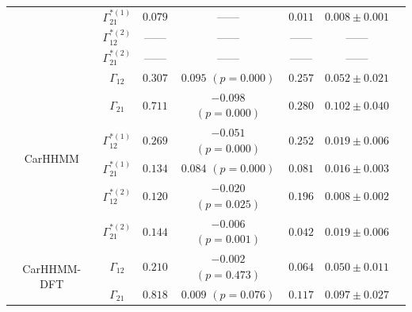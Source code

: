 \documentclass{article}
\begin{document}
\begin{center}
{\begin{tabular}{ccccccc}
                             & $\Gamma^{*(1)}_{21}$          & $0.079$                         & ------                   & $0.011$                           & $0.008 \pm 0.001$                             \\
                             & $\Gamma^{*(2)}_{12}$          & ------                         & ------                   & ------                           & ------                                      \\
                             & $\Gamma^{*(2)}_{21}$          & ------                         & ------                   & ------                           & ------                                      \\ \hline
\multirow{6}{*}{CarHHMM}     & $\Gamma_{12}$                 & $0.307$                         & $0.095$ $(p=0.000)$        & $0.257$                           & $0.052 \pm 0.021$                             \\
                             & $\Gamma_{21}$                 & $0.711$                         & $-0.098$ $(p=0.000)$        & $0.280$                           & $0.102 \pm 0.040$                             \\
                             & $\Gamma^{*(1)}_{12}$          & $0.269$                         & $-0.051$ $(p=0.000)$        & $0.252$                           & $0.019 \pm 0.006$                             \\
                             & $\Gamma^{*(1)}_{21}$          & $0.134$                         & $0.084$ $(p=0.000)$        & $0.081$                           & $0.016 \pm 0.003$                             \\
                             & $\Gamma^{*(2)}_{12}$          & $0.120$                         & $-0.020$ $(p=0.025)$        & $0.196$                           & $0.008 \pm 0.002$                             \\
                             & $\Gamma^{*(2)}_{21}$          & $0.144$                         & $-0.006$ $(p=0.001)$        & $0.042$                           & $0.019 \pm 0.006$                             \\ \hline
\multirow{6}{*}{CarHHMM-DFT} & $\Gamma_{12}$                 & $0.210$                         & $-0.002$ $(p=0.473)$        & $0.064$                           & $0.050 \pm 0.011$                             \\
                             & $\Gamma_{21}$                 & $0.818$                         & $0.009$ $(p=0.076)$        & $0.117$                           & $0.097 \pm 0.027$                             \\

\end{tabular}}
\end{center}
\end{document}
